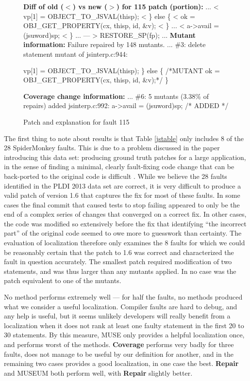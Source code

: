 \begin{figure}
{\scriptsize
\begin{code}
{\bf Diff of old ($<$) vs new ($>$) for 115 patch (portion):}
...
<             vp[1] = OBJECT\_TO\_JSVAL(thisp);
<         \} else \{
<             ok = OBJ\_GET\_PROPERTY(cx, thisp, id, \&v);
<         \}
...
<                   a->avail = (jsuword)sp;
<               \}
...
---
>         RESTORE\_SP(fp);
...
{\bf Mutant information:}
Failure repaired by 148 mutants.
...
\#3: delete statement mutant of jsinterp.c:944:

            vp[1] = OBJECT\_TO\_JSVAL(thisp);
        \} else \{
/*MUTANT    ok = OBJ\_GET\_PROPERTY(cx, thisp, id, \&v);*/
        \}

{\bf Coverage change information:}
...
\#6: 5 mutants (3.38\% of repairs) added jsinterp.c:992:
                   a->avail = (jsuword)sp; /* ADDED */
\end{code}
}
\caption{Patch and explanation for fault 115}
\label{fig:explain}
\end{figure}

The first thing to note about results is that Table \ref{jstable} only includes 8 of the 28 SpiderMonkey faults.  This is due to a problem discussed in the paper introducing this data set:  producing ground truth patches for a large application, in the sense of finding a minimal, clearly fault-fixing code change that can be back-ported to the original code is difficult \cite{PLDI13}.  While we believe the 28 faults identified in the PLDI 2013 data set are correct, it is very difficult to produce a valid patch of version 1.6 that captures the fix for most of these faults.  In some cases the final commit that caused tests to stop failing appeared to only be the end of a complex series of changes that converged on a correct fix.  In other cases, the code was modified so extensively before the fix that identifying ``the incorrect part'' of the original code seemed to owe more to guesswork than certainty.  The evaluation of localization therefore only examines the 8 faults for which we could be reasonably certain that the patch to 1.6 was correct and characterized the fault in question accurately.  The smallest patch required modification of two statements, and was thus larger than any mutants applied.  In no case was the patch equivalent to one of the mutants.

No method performs extremely well --- for half the faults, no methods produced what we consider a useful localization.   Compiler faults are hard to debug, and any help is useful, but it seems unlikely developers will really benefit from a localization when it does not rank at least one faulty statement in the first 20 to 30 statements.  By this measure, MUSE only provides a helpful localization once, and performs worst of the methods.  {\bf Coverage} performs very badly for three faults, does not manage to be useful by our definition for another, and in the remaining two cases provides a good localization, in one case the best.  {\bf Repair} and MUSEUM both perform well, with {\bf Repair} slightly better.


